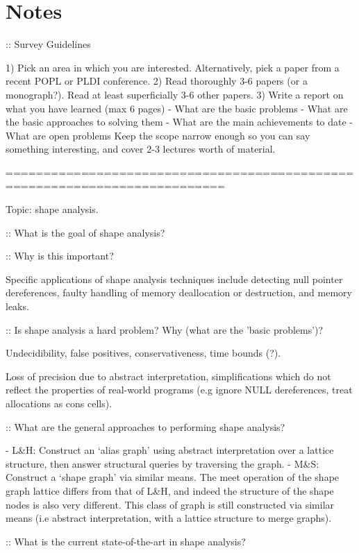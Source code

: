 \documentclass{article}
\begin{document}
\section*{Notes}

:: Survey Guidelines

1) Pick an area in which you are interested. Alternatively, pick a paper
   from a recent POPL or PLDI conference. 
2) Read thoroughly 3-6 papers (or a monograph?). Read at least superficially
   3-6 other papers. 
3) Write a report on what you have learned (max 6 pages)
        - What are the basic problems
        - What are the basic approaches to solving them
        - What are the main achievements to date
        - What are open problems
Keep the scope narrow enough so you can say something interesting, and cover
2-3 lectures worth of material.

===========================================================================

Topic: shape analysis.

:: What is the goal of shape analysis?

:: Why is this important?

Specific applications of shape analysis techniques include detecting null
pointer dereferences, faulty handling of memory deallocation or destruction,
and memory leaks.

:: Is shape analysis a hard problem? Why (what are the 'basic problems')?

Undecidibility, false positives, conservativeness, time bounds (?).

Loss of precision due to abstract interpretation, simplifications which do not
reflect the properties of real-world programs (e.g ignore NULL dereferences,
treat allocations as cons cells).

:: What are the general approaches to performing shape analysis?

- L\&H: Construct an `alias graph' using abstract interpretation over a lattice
  structure, then answer structural queries by traversing the graph.
- M\&S: Construct a `shape graph' via similar means. The meet operation of the
  shape graph lattice differs from that of L\&H, and indeed the structure of the
  shape nodes is also very different. This class of graph is still constructed
  via similar means (i.e abstract interpretation, with a lattice structure to
  merge graphs).

:: What is the current state-of-the-art in shape analysis?
\end{document}
